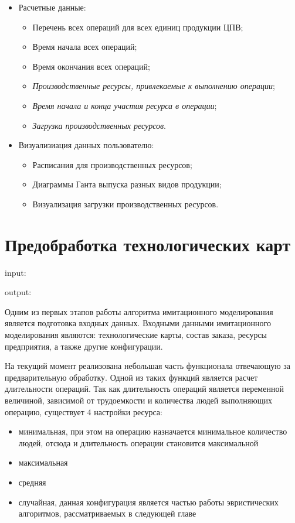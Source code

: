 \begin{itemize}
	\item Расчетные данные:	
		\begin{itemize}
			\item Перечень всех операций для всех единиц продукции ЦПВ;
			\item Время начала всех операций;
			\item Время окончания всех операций;
			\item \textit{Производственные ресурсы, привлекаемые к выполнению операции};
			\item \textit{Время начала и конца участия ресурса в операции};
			\item \textit{Загрузка производственных ресурсов}.
		\end{itemize}		
	\item Визуализиация данных пользователю:
		\begin{itemize}
			\item Расписания для производственных ресурсов;
			\item Диаграммы Ганта выпуска разных видов продукции;
			\item Визуализация загрузки производственных ресурсов.
		\end{itemize}		 
\end{itemize}

\section{Предобработка технологических карт}

input:

output:

Одним из первых этапов работы алгоритма имитационного моделирования является подготовка входных данных. Входными данными имитационного моделирования являются: технологические карты, состав заказа, ресурсы предприятия, а также другие конфигурации.

На текущий момент реализована небольшая часть функционала отвечающую за предварительную обработку. Одной из таких функций является расчет длительности операций. Так как длительность операций является переменной величиной, зависимой от трудоемкости и количества людей выполняющих операцию, существует 4 настройки ресурса:

\begin{itemize}
    \item минимальная, при этом на операцию назначается минимальное количество людей, отсюда и длительность операции становится максимальной
    \item максимальная
    \item средняя
    \item случайная, данная конфигурация является частью работы эвристических алгоритмов, рассматриваемых в следующей главе
\end{itemize}

